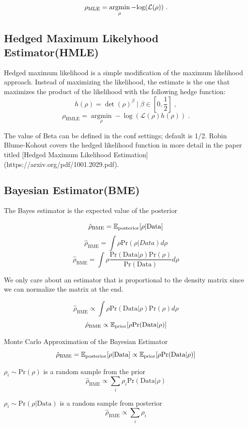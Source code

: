 \documentclass{article}
\begin{document}
$$\rho_\text{MLE} =
\operatorname*{argmin}_{\rho} -\text{log}(\mathcal{L}(\rho)) \; .$$

\subsection{Hedged Maximum Likelyhood Estimator(HMLE)}
Hedged maximum likelihood is a simple modification of the maximum likelihood approach. Instead of maximizing the likelihood, the estimate is the one that maximizes the product of the likelihood with the following hedge function:
$$h(\rho)=\operatorname{det}(\rho)^{\beta} \mid \beta \in\left[0, \frac{1}{2}\right] \;,$$
$$\rho_{\mathrm{HMLE}}=\underset{\rho}{\operatorname{argmin}}-\log (\mathcal{L}(\rho) h(\rho)) \;.$$

The value of Beta can be defined in the conf settings; default is 1/2. Robin Blume-Kohout covers the hedged likelihood function in more detail in the paper titled [Hedged Maximum Likelihood Estimation](https://arxiv.org/pdf/1001.2029.pdf).

\subsection{Bayesian Estimator(BME)}
The Bayes estimator is the expected value of the posterior

$$\hat{\rho}_\text{BME} = \mathbb{E}_\text{posterior}[\rho | \text{Data}]$$
$$\hat{\rho}_\text{BME} = \int\rho\text{Pr}(\rho|Data) d\rho$$
$$\hat{\rho}_\text{BME} =  \int\rho \frac{\text{Pr}(\text{Data}|\rho)\text{Pr}(\rho)}{\text{Pr}(\text{Data})} d\rho$$

We only care about an estimator that is proportional to the density matrix since we can normalize the matrix at the end.

$$\hat{\rho}_\text{BME} \propto \int\rho\text{Pr}(\text{Data}|\rho)\text{Pr}(\rho) d\rho$$
$$\hat{\rho}_\text{BME} \propto \mathbb{E}_\text{prior}[\rho\text{Pr}(\text{Data}|\rho)]$$

Monte Carlo Approximation of the Bayesian Estimator
$$\hat\rho_\text{BME}
=       \mathbb{E}_\text{posterior}[\rho | \text{Data}]
\propto \mathbb{E}_\text{prior}[\rho\text{Pr}(\text{Data}|\rho)]$$

$\rho_i \sim \text{Pr}(\rho)$ is a random sample from the prior
$$\hat\rho_\text{BME} \propto \sum_i \rho_i\text{Pr}(\text{Data}|\rho)$$

$\rho_i \sim \text{Pr}(\rho | \text{Data})$ is a random sample from posterior
$$\hat\rho_\text{BME} \propto \sum_i \rho_i$$
\end{document}
